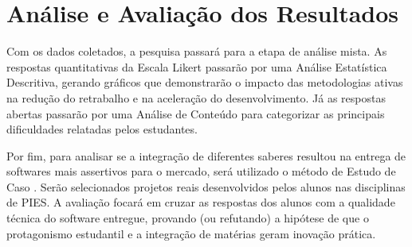\section{Análise e Avaliação dos Resultados}\label{sec:analise-e-avaliacao-dos-resultados}
Com os dados coletados, a pesquisa passará para a etapa de análise mista. As
respostas quantitativas da Escala Likert passarão por uma Análise Estatística
Descritiva, gerando gráficos que demonstrarão o impacto das metodologias ativas
na redução do retrabalho e na aceleração do desenvolvimento. Já as respostas
abertas passarão por uma Análise de Conteúdo \cite{bardin2016analise} para
categorizar as principais dificuldades relatadas pelos estudantes.

Por fim, para analisar se a integração de diferentes saberes resultou na
entrega de softwares mais assertivos para o mercado, será utilizado o método de
Estudo de Caso \cite{yin2015estudo}. Serão selecionados projetos reais
desenvolvidos pelos alunos nas disciplinas de PIES. A avaliação focará em
cruzar as respostas dos alunos com a qualidade técnica do software entregue,
provando (ou refutando) a hipótese de que o protagonismo estudantil e a
integração de matérias geram inovação prática.
